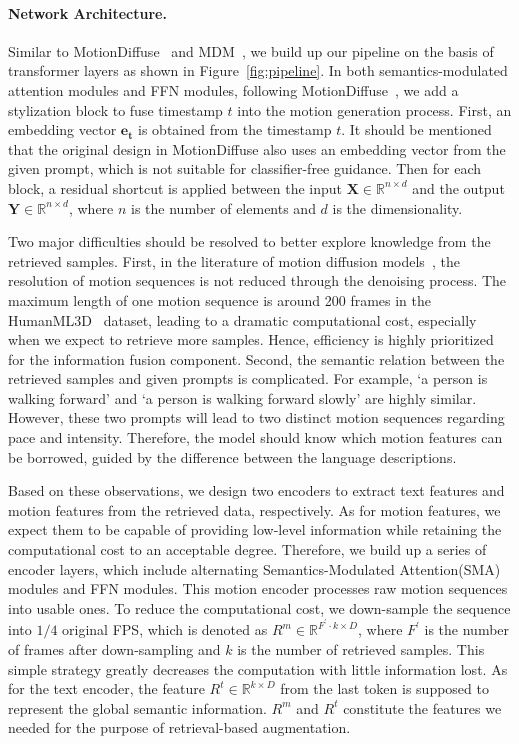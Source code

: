 \documentclass[10pt,twocolumn,letterpaper]{article}
\begin{document}
\paragraph{Network Architecture.} Similar to MotionDiffuse~\cite{zhang2022motiondiffuse} and MDM~\cite{tevet2022human}, we build up our pipeline on the basis of transformer layers as shown in Figure~\ref{fig:pipeline}. In both semantics-modulated attention modules and FFN modules, following MotionDiffuse~\cite{zhang2022motiondiffuse}, we add a stylization block to fuse timestamp $t$ into the motion generation process. First, an embedding vector $\mathbf{e_t}$ is obtained from the timestamp $t$. It should be mentioned that the original design in MotionDiffuse also uses an embedding vector from the given prompt, which is not suitable for classifier-free guidance. Then for each block, a residual shortcut is applied between the input $\mathbf{X} \in \mathbb{R}^{n \times d}$ and the output $\mathbf{Y} \in \mathbb{R}^{n \times d}$, where $n$ is the number of elements and $d$ is the dimensionality.

Two major difficulties should be resolved to better explore knowledge from the retrieved samples. First, in the literature of motion diffusion models~\cite{zhang2022motiondiffuse,tevet2022human}, the resolution of motion sequences is not reduced through the denoising process. The maximum length of one motion sequence is around 200 frames in the HumanML3D~\cite{guo2022generating} dataset, leading to a dramatic computational cost, especially when we expect to retrieve more samples. Hence, efficiency is highly prioritized for the information fusion component. Second, the semantic relation between the retrieved samples and given prompts is complicated. For example, `a person is walking forward' and `a person is walking forward slowly' are highly similar. However, these two prompts will lead to two distinct motion sequences regarding pace and intensity. Therefore, the model should know which motion features can be borrowed, guided by the difference between the language descriptions.

Based on these observations, we design two encoders to extract text features and motion features from the retrieved data, respectively. As for motion features, we expect them to be capable of providing low-level information while retaining the computational cost to an acceptable degree. Therefore, we build up a series of encoder layers, which include alternating Semantics-Modulated Attention(SMA) modules and FFN modules. This motion encoder processes raw motion sequences into usable ones. To reduce the computational cost, we down-sample the sequence into $1/4$ original FPS, which is denoted as $R^m \in \mathbb{R}^{F^{\prime} \cdot k \times D}$, where $F^{\prime}$ is the number of frames after down-sampling and $k$ is the number of retrieved samples. This simple strategy greatly decreases the computation with little information lost. As for the text encoder, the feature $R^t \in \mathbb{R}^{k \times D}$ from the last token is supposed to represent the global semantic information. $R^m$ and $R^t$ constitute the features we needed for the purpose of retrieval-based augmentation.
\end{document}
